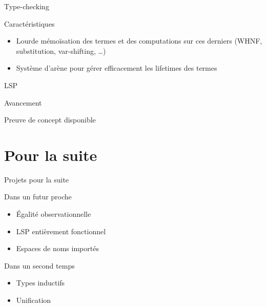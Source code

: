 \documentclass[12pt]{beamer}
\begin{document}
        \begin{frame}{Type-checking}
            
            \begin{block}{Caractéristiques}
                
                \begin{itemize}
                    \item Lourde mémoïsation des termes et des computations sur ces derniers (WHNF, substitution, var-shifting, \dots) \pause
                    \item Système d'arène pour gérer efficacement les lifetimes des termes
                \end{itemize}

            \end{block}

        \end{frame}

        \begin{frame}{LSP}
            
            \begin{block}{Avancement}
                
                Preuve de concept disponible

            \end{block}

        \end{frame}

    \section{Pour la suite}

        \begin{frame}{Projets pour la suite}
            
            \begin{block}{Dans un futur proche}
                
                \begin{itemize}
                    \item Égalité observationnelle
                    \item LSP entièrement fonctionnel
                    \item Espaces de noms importés
                \end{itemize}

            \end{block} \pause

            \begin{block}{Dans un second temps}
                
                \begin{itemize}
                    \item Types inductifs
                    \item Unification
                \end{itemize}

            \end{block}

        \end{frame}
\end{document}
